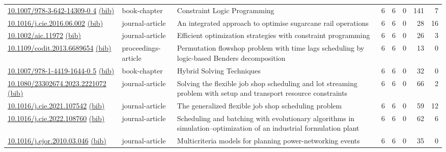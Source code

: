 {\begin{longtable}{p{5cm}lp{11cm}rrrrr}
\href{http://dx.doi.org/10.1007/978-3-642-14309-0_4}{10.1007/978-3-642-14309-0 4} \href{https://www.doi2bib.org/bib/10.1007/978-3-642-14309-0_4}{(bib)} & book-chapter & Constraint Logic Programming & 6 & 6 & 0 & 141 & 7 \\
\href{http://dx.doi.org/10.1016/j.cie.2016.06.002}{10.1016/j.cie.2016.06.002} \href{https://www.doi2bib.org/bib/10.1016/j.cie.2016.06.002}{(bib)} & journal-article & An integrated approach to optimise sugarcane rail operations & 6 & 6 & 0 & 28 & 16 \\
\href{http://dx.doi.org/10.1002/aic.11972}{10.1002/aic.11972} \href{https://www.doi2bib.org/bib/10.1002/aic.11972}{(bib)} & journal-article & Efficient optimization strategies with constraint programming & 6 & 6 & 0 & 26 & 3 \\
\href{http://dx.doi.org/10.1109/codit.2013.6689654}{10.1109/codit.2013.6689654} \href{https://www.doi2bib.org/bib/10.1109/codit.2013.6689654}{(bib)} & proceedings-article & Permutation flowshop problem with time lags scheduling by logic-based Benders decomposition & 6 & 6 & 0 & 13 & 0 \\
\href{http://dx.doi.org/10.1007/978-1-4419-1644-0_5}{10.1007/978-1-4419-1644-0 5} \href{https://www.doi2bib.org/bib/10.1007/978-1-4419-1644-0_5}{(bib)} & book-chapter & Hybrid Solving Techniques & 6 & 6 & 0 & 32 & 0 \\
\href{http://dx.doi.org/10.1080/23302674.2023.2221072}{10.1080/23302674.2023.2221072} \href{https://www.doi2bib.org/bib/10.1080/23302674.2023.2221072}{(bib)} & journal-article & Solving the flexible job shop scheduling and lot streaming problem with setup and transport resource constraints & 6 & 6 & 0 & 66 & 2 \\
\href{http://dx.doi.org/10.1016/j.cie.2021.107542}{10.1016/j.cie.2021.107542} \href{https://www.doi2bib.org/bib/10.1016/j.cie.2021.107542}{(bib)} & journal-article & The generalized flexible job shop scheduling problem & 6 & 6 & 0 & 59 & 12 \\
\href{http://dx.doi.org/10.1016/j.cie.2022.108760}{10.1016/j.cie.2022.108760} \href{https://www.doi2bib.org/bib/10.1016/j.cie.2022.108760}{(bib)} & journal-article & Scheduling and batching with evolutionary algorithms in simulation–optimization of an industrial formulation plant & 6 & 6 & 0 & 62 & 6 \\
\href{http://dx.doi.org/10.1016/j.ejor.2010.03.046}{10.1016/j.ejor.2010.03.046} \href{https://www.doi2bib.org/bib/10.1016/j.ejor.2010.03.046}{(bib)} & journal-article & Multicriteria models for planning power-networking events & 6 & 6 & 0 & 35 & 0 \\

\end{longtable}}
